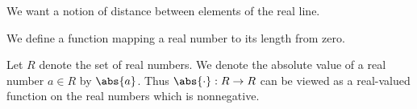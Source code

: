 
\sbasic

\sstart
{}


We want a notion
of distance between
elements of the real
line.


We define a function
mapping a real number
to its length from zero.


Let $R$ denote the set of real numbers.
We denote the absolute value
of a real number $a \in R$ by $\abs{a}$.
Thus $\abs{\cdot}: R \to R$ can be viewed
as a real-valued function on the real numbers
which is nonnegative.
\strats

